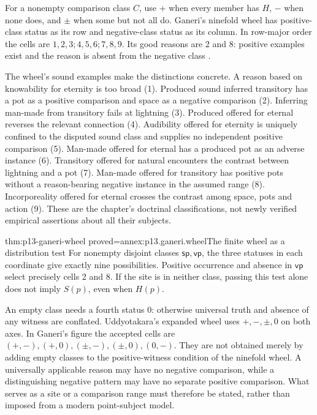 For a nonempty comparison class \(C\), use \(+\) when every member has \(H\),
\(-\) when none does, and \(\pm\) when some but not all do.
Ganeri's ninefold wheel has positive-class status as its row and
negative-class status as its column. In row-major order the cells are
\(1,2,3;4,5,6;7,8,9\). Its good reasons are 2 and 8:
positive examples exist and the reason is absent from the negative class
\cite[pp.~344--350, figures~2--4]{Ganeri2004IndianLogicPublished}.

The wheel's sound examples make the distinctions concrete. A reason based
on knowability for eternity is too broad (1). Produced sound inferred
transitory has a pot as a positive comparison and space as a negative
comparison (2). Inferring man-made from transitory fails at lightning (3).
Produced offered for eternal reverses the relevant connection (4).
Audibility offered for eternity is uniquely confined to the disputed sound
class and supplies no independent positive comparison (5). Man-made offered
for eternal has a produced pot as an adverse instance (6).
Transitory offered for natural encounters the contrast between lightning
and a pot (7). Man-made offered for transitory has positive pots without
a reason-bearing negative instance in the assumed range (8).
Incorporeality offered for eternal crosses the contrast among space,
pots and action (9). These are the chapter's doctrinal classifications,
not newly verified empirical assertions about all their subjects.

\begin{hblemma}{thm:p13-ganeri-wheel}
 {proved=annex:p13.ganeri.wheel}{The finite wheel as a distribution test}
For nonempty disjoint classes \(\mathsf{sp},\mathsf{vp}\), the three statuses
in each coordinate give exactly nine possibilities. Positive occurrence
and absence in \(\mathsf{vp}\) select precisely cells 2 and 8.
If the site is in neither class, passing this test alone does not imply
\(S(p)\), even when \(H(p)\).
\end{hblemma}

An empty class needs a fourth status \(0\): otherwise universal truth and
absence of any witness are conflated. Uddyotakara's expanded wheel uses
\(+,-,\pm,0\) on both axes. In Ganeri's figure the accepted cells are
\((+,-),(+,0),(\pm,-),(\pm,0),(0,-)\). They are not obtained merely
by adding empty classes to the positive-witness condition of the ninefold
wheel. A universally applicable reason may have no negative comparison,
while a distinguishing negative pattern may have no separate positive
comparison. What serves as a site or a comparison range must therefore
be stated, rather than imposed from a modern point-subject model.

